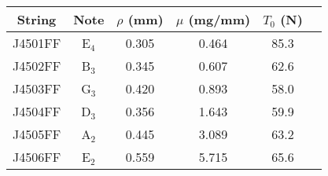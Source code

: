 \begin{tabular}{cccccc}
\toprule
String & Note & $\rho$ (mm) & $\mu$ (mg/mm) & $T_0$ (N) \\
\midrule
J4501FF & E$_{4}$ & 0.305 & 0.464 & 85.3 \\
J4502FF & B$_{3}$ & 0.345 & 0.607 & 62.6 \\
J4503FF & G$_{3}$ & 0.420 & 0.893 & 58.0 \\
J4504FF & D$_{3}$ & 0.356 & 1.643 & 59.9 \\
J4505FF & A$_{2}$ & 0.445 & 3.089 & 63.2 \\
J4506FF & E$_{2}$ & 0.559 & 5.715 & 65.6 \\
\bottomrule
\end{tabular}

